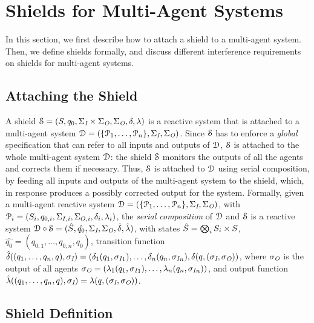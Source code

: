 \section{Shields  for Multi-Agent Systems}
\label{def_shields}

In this section, we first describe how to attach a  shield to a multi-agent system. Then, we define shields formally, and discuss different interference requirements on shields for multi-agent systems.

\subsection{Attaching the Shield}

A shield $\mathcal{S} = (S,q_{0},\Sigma_{\textit{I}}\times\Sigma_{\textit{O}},\Sigma_{\textit{O}},\delta,\lambda)$ is a reactive system that is attached to a multi-agent system
$\mathcal{D}=(\{ \mathcal{P}_1,\ldots,\mathcal{P}_n \},\Sigma_{\textit{I}},  \Sigma_{\textit{O}})$.
Since $\mathcal{S}$ has to enforce a \emph{global} specification that can refer to all inputs and outputs of $\mathcal{D}$, $\mathcal{S}$ is attached to the whole multi-agent system $\mathcal{D}$: the shield $\mathcal{S}$ monitors the outputs of all the agents and corrects them if necessary. Thus, $\mathcal{S}$ is attached to $\mathcal{D}$ using serial composition, by feeding  all inputs and outputs of the multi-agent system to the shield, which, in response produces a possibly corrected output for the system.
Formally, given a multi-agent reactive system $\mathcal{D} = (\{ \mathcal{P}_1,\ldots,\mathcal{P}_n \}, \Sigma_{\textit{I}},  \Sigma_{\textit{O}})$, with $\mathcal{P}_i = (S_i, q_{0,i},\Sigma_{I,i},\Sigma_{O,i},\delta_i,\lambda_i)$, the \emph{serial composition} of $\mathcal{D}$ and $\mathcal{S}$ is a reactive system $\mathcal{D} \circ \mathcal{S}=
(\hat{S}, \hat{q_{0}}, \Sigma_{\textit{I}},\Sigma_{\textit{O}}, \hat{\delta},
\hat{\lambda})$, with 
   states $\hat{S} = \bigotimes_i S_i \times S$,
    $\hat{q_{0}} = (q_{0,1},\ldots,q_{0,n},q_{0})$,
   transition function $\hat{\delta}((q_1,\ldots,q_n,q),\sigma_{\textit{I}}) = (\delta_1(q_1,{\sigma_{\textit{I}}}_1),\ldots,\delta_n(q_n,{\sigma_{\textit{I}}}_n), \delta(q,(\sigma_{\textit{I}},\sigma_{\textit{O}}))$, where $\sigma_{\textit{O}}$ is the output of all agents $\sigma_{\textit{O}} = (\lambda_1(q_1,{\sigma_{\textit{I}}}_1),\ldots,\lambda_n(q_n,{\sigma_{\textit{I}}}_n))$, and output function
   $\hat{\lambda}((q_1,\ldots,q_n,q),\sigma_{\textit{I}}) = \lambda(q,(\sigma_{\textit{I}},\sigma_{\textit{O}}))$.



\subsection{Shield Definition}\label{sec_correctness}

